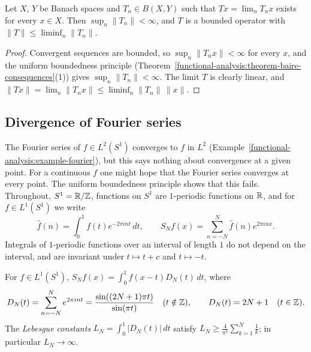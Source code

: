 \begin{corollary}\label{functional-analysis:corollary-banach-steinhaus}
Let $X$, $Y$ be Banach spaces and $T_n \in B(X, Y)$ such that $Tx = \lim_nT_nx$ exists for every $x \in X$. Then $\sup_n\|T_n\| < \infty$, and $T$ is a bounded operator with
$\|T\| \leq \liminf_n\|T_n\|$.
\end{corollary}

\begin{proof}
Convergent sequences are bounded, so $\sup_n\|T_nx\| < \infty$ for every $x$, and the uniform boundedness principle (Theorem~\ref{functional-analysis:theorem-baire-consequences}(1)) gives
$\sup_n\|T_n\| < \infty$. The limit $T$ is clearly linear, and $\|Tx\| = \lim_n\|T_nx\| \leq \liminf_n\|T_n\|\,\|x\|$.
\end{proof}

\subsection{Divergence of Fourier series}\label{functional-analysis:subsection-fourier-divergence}

The Fourier series of $f \in L^2(S^1)$ converges to $f$ in $L^2$ (Example~\ref{functional-analysis:example-fourier}), but this says nothing about convergence at a given point. For a continuous $f$ one
might hope that the Fourier series converges at every point. The uniform boundedness principle shows that this fails. Throughout, $S^1 = \mathbb{R}/\mathbb{Z}$, functions on $S^1$ are $1$-periodic functions on $\mathbb{R}$, and
for $f \in L^1(S^1)$ we write
\[
\hat f(n) = \int_0^1f(t)e^{-2\pi int}\,dt, \qquad S_Nf(x) = \sum_{n=-N}^N\hat f(n)e^{2\pi inx}.
\]
Integrals of $1$-periodic functions over an interval of length $1$ do not depend on the interval, and are invariant under $t \mapsto t + c$ and $t \mapsto -t$.

\begin{lemma}\label{functional-analysis:lemma-dirichlet-kernel}
For $f \in L^1(S^1)$, $S_Nf(x) = \int_0^1f(x - t)D_N(t)\,dt$, where
\[
D_N(t) = \sum_{n=-N}^Ne^{2\pi int} = \frac{\sin((2N + 1)\pi t)}{\sin(\pi t)} \quad (t \notin \mathbb{Z}), \qquad D_N(t) = 2N + 1 \quad (t \in \mathbb{Z}).
\]
The \emph{Lebesgue constants} $L_N = \int_0^1|D_N(t)|\,dt$ satisfy $L_N \geq \frac{4}{\pi^2}\sum_{k=1}^N\frac1k$; in particular $L_N \to \infty$.
\end{lemma}

